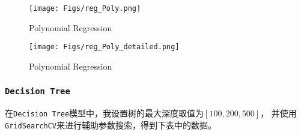 \documentclass[12pt, a4paper, oneside]{ctexart}
\begin{document}
\begin{figure}[H]
    \centering
    \texttt{[image: Figs/reg\_Poly.png]}
    \caption{Polynomial Regression}
\end{figure}

\begin{figure}[H]
    \centering
    \texttt{[image: Figs/reg\_Poly\_detailed.png]}
    \caption{Polynomial Regression}
\end{figure}


\subsubsection{\texttt{Decision Tree}}
在\texttt{Decision Tree}模型中，我设置树的最大深度取值为$\left[100, 200, 500\right]$，
并使用\texttt{GridSearchCV}来进行辅助参数搜索，得到下表中的数据。
\end{document}
